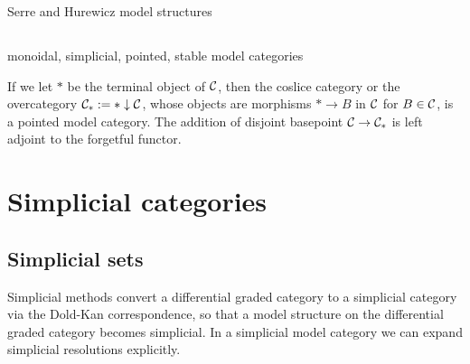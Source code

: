 \documentclass{../../large}
\begin{document}
\begin{prb}
\end{prb}

\begin{prb}[]
Serre and Hurewicz model structures
\end{prb}





\section{}

monoidal, simplicial, pointed, stable model categories

If we let $*$ be the terminal object of $\mathcal{C}$, then the coslice category or the overcategory $\mathcal{C}_*:=*\downarrow\mathcal{C}$, whose objects are morphisms $*\to B$ in $\mathcal{C}$ for $B\in\mathcal{C}$, is a pointed model category.
The addition of disjoint basepoint $\mathcal{C}\to\mathcal{C}_*$ is left adjoint to the forgetful functor.








\chapter{Simplicial categories}

\section{Simplicial sets}

Simplicial methods convert a differential graded category to a simplicial category via the Dold-Kan correspondence, so that a model structure on the differential graded category becomes simplicial.
In a simplicial model category we can expand simplicial resolutions explicitly.
\end{document}
